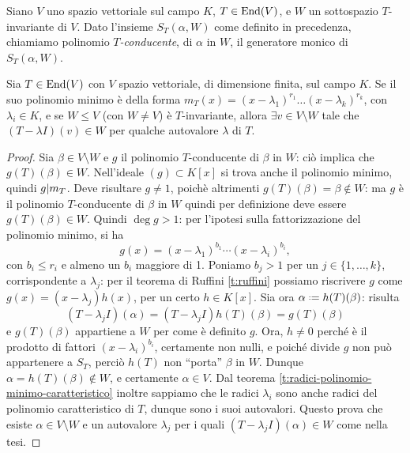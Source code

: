 Siano $V$ uno spazio vettoriale sul campo $K$, $T\in\operatorname{End}(V)$, e $W$ un sottospazio $T$-invariante di $V$.
Dato l'insieme $S_T(\alpha,W)$ come definito in precedenza, chiamiamo polinomio \emph{$T$-conducente}, di $\alpha$ in $W$, il generatore monico di $S_T(\alpha,W)$.

\begin{lemma} \label{l:conducente}
	Sia $T\in \operatorname{End}(V)$ con $V$ spazio vettoriale, di dimensione finita, sul campo $K$.
	Se il suo polinomio minimo è della forma $m_T(x) = (x-\lambda_1)^{r_1}\dots(x-\lambda_k)^{r_k}$, con $\lambda_i\in K$, e se $W\le V$ (con $W\ne V$) è $T$-invariante, allora $\exists v\in V\setminus W$ tale che $(T-\lambda I)(v)\in W$ per qualche autovalore $\lambda$ di $T$.
\end{lemma}
\begin{proof}
	Sia $\beta\in V\setminus W$ e $g$ il polinomio $T$-conducente di $\beta$ in $W$: ciò implica che $g(T)(\beta)\in W$.
	Nell'ideale $(g)\subset K[x]$ si trova anche il polinomio minimo, quindi $g| m_T$.
	Deve risultare $g\ne 1$, poichè altrimenti $g(T)(\beta) = \beta\notin W$: ma $g$ è il polinomio $T$-conducente di $\beta$ in $W$ quindi per definizione deve essere $g(T)(\beta)\in W$.
	Quindi $\deg g>1$: per l'ipotesi sulla fattorizzazione del polinomio minimo, si ha
	\begin{equation*}
		g(x) = (x-\lambda_1)^{b_1}\cdots (x-\lambda_i)^{b_i},
	\end{equation*}
	con $b_i\le r_i$ e almeno un $b_i$ maggiore di 1.
	Poniamo $b_j > 1$ per un $j\in\{1,\dots,k\}$, corrispondente a $\lambda_j$: per il teorema di Ruffini \ref{t:ruffini} possiamo riscrivere $g$ come $g(x) = (x-\lambda_j)h(x)$, per un certo $h\in K[x]$.
	Sia ora $\alpha\defeq h(T)(\beta)$: risulta
	\begin{equation*}
		(T-\lambda_j I)(\alpha)=(T-\lambda_j I)h(T)(\beta)=g(T)(\beta)
	\end{equation*}
	e $g(T)(\beta)$ appartiene a $W$ per come è definito $g$.
	Ora, $h\ne 0$ perch\'e è il prodotto di fattori $(x-\lambda_i)^{b_i}$, certamente non nulli, e poich\'e divide $g$ non può appartenere a $S_T$, perciò $h(T)$ non ``porta'' $\beta$ in $W$.
	Dunque $\alpha=h(T)(\beta)\notin W$, e certamente $\alpha\in V$.
	Dal teorema \ref{t:radici-polinomio-minimo-caratteristico} inoltre sappiamo che le radici $\lambda_i$ sono anche radici del polinomio caratteristico di $T$, dunque sono i suoi autovalori.
	Questo prova che esiste $\alpha\in V\setminus W$ e un autovalore $\lambda_j$ per i quali $(T-\lambda_j I)(\alpha)\in W$ come nella tesi.
\end{proof}

